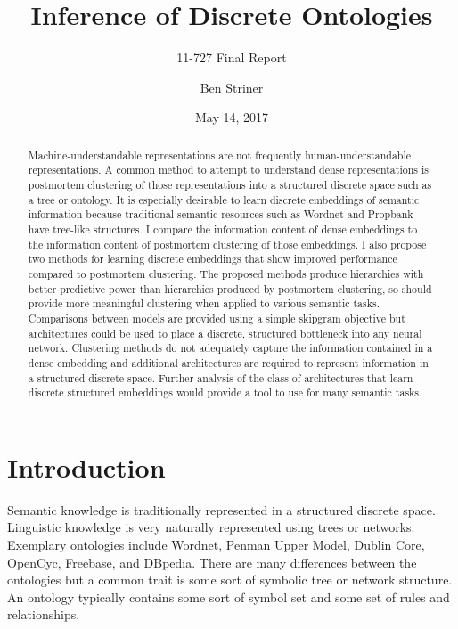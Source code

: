 \documentclass[sigconf]{acmart}
\begin{document}
\title{Inference of Discrete Ontologies}
\date{May 14, 2017}
\subtitle{11-727 Final Report}

\author{Ben Striner}


\begin{abstract}
Machine-understandable representations are not frequently human-understandable representations. A common method to attempt to understand dense representations is postmortem clustering of those representations into a structured discrete space such as a tree or ontology. It is especially desirable to learn discrete embeddings of semantic information because traditional semantic resources such as Wordnet and Propbank have tree-like structures. I compare the information content of dense embeddings to the information content of postmortem clustering of those embeddings. I also propose two methods for learning discrete embeddings that show improved performance compared to postmortem clustering. The proposed methods produce hierarchies with better predictive power than hierarchies produced by postmortem clustering, so should provide more meaningful clustering when applied to various semantic tasks. Comparisons between models are provided using a simple skipgram objective but architectures could be used to place a discrete, structured bottleneck into any neural network. Clustering methods do not adequately capture the information contained in a dense embedding and additional architectures are required to represent information in a structured discrete space. Further analysis of the class of architectures that learn discrete structured embeddings would provide a tool to use for many semantic tasks.
\end{abstract}

\maketitle

\section{Introduction}

Semantic knowledge is traditionally represented in a structured discrete space. Linguistic knowledge is very naturally represented using trees or networks. Exemplary ontologies include Wordnet, Penman Upper Model,  Dublin Core, OpenCyc, Freebase, and DBpedia. There are many differences between the ontologies but a common trait is some sort of symbolic tree or network structure. An ontology typically contains some sort of symbol set and some set of rules and relationships.
\end{document}
